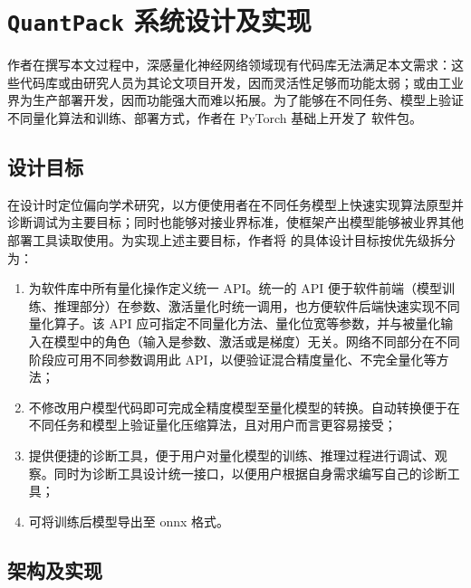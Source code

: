 \chapter{\texttt{QuantPack} 系统设计及实现} \label{chap::quant_pack}
作者在撰写本文过程中，深感量化神经网络领域现有代码库无法满足本文需求：这些代码库或由研究人员为其论文项目开发，因而灵活性足够而功能太弱；或由工业界为生产部署开发，因而功能强大而难以拓展。为了能够在不同任务、模型上验证不同量化算法和训练、部署方式，作者在 PyTorch 基础上开发了 \QP 软件包。
\section{设计目标}
\QP 在设计时定位偏向学术研究，以方便使用者在不同任务模型上快速实现算法原型并诊断调试为主要目标；同时也能够对接业界标准，使框架产出模型能够被业界其他部署工具读取使用。为实现上述主要目标，作者将 \QP 的具体设计目标按优先级拆分为：
\begin{enumerate}
  \item 为软件库中所有量化操作定义统一 API。统一的 API 便于软件前端（模型训练、推理部分）在参数、激活量化时统一调用，也方便软件后端快速实现不同量化算子。该 API 应可指定不同量化方法、量化位宽等参数，并与被量化输入在模型中的角色（输入是参数、激活或是梯度）无关。网络不同部分在不同阶段应可用不同参数调用此 API，以便验证混合精度量化、不完全量化等方法；
  \item 不修改用户模型代码即可完成全精度模型至量化模型的转换。自动转换便于在不同任务和模型上验证量化压缩算法，且对用户而言更容易接受；
  \item 提供便捷的诊断工具，便于用户对量化模型的训练、推理过程进行调试、观察。同时为诊断工具设计统一接口，以便用户根据自身需求编写自己的诊断工具；
  \item 可将训练后模型导出至 onnx 格式。
\end{enumerate}
\section{架构及实现}
